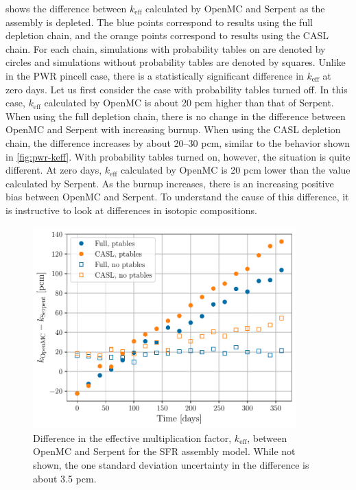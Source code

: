 \documentclass[3p,authoryear]{elsarticle}
\begin{document}
 shows the difference between $k_\text{eff}$ calculated by
OpenMC and Serpent as the assembly is depleted. The blue points correspond to
results using the full depletion chain, and the orange points correspond to
results using the CASL chain. For each chain, simulations with probability
tables on are denoted by circles and simulations without probability tables are
denoted by squares. Unlike in the PWR pincell case, there is a statistically
significant difference in $k_\text{eff}$ at zero days. Let us first consider the
case with probability tables turned off. In this case, $k_\text{eff}$ calculated
by OpenMC is about 20 pcm higher than that of Serpent. When using the full
depletion chain, there is no change in the difference between OpenMC and Serpent
with increasing burnup. When using the CASL depletion chain, the difference
increases by about 20--30 pcm, similar to the behavior shown in
\cref{fig:pwr-keff}. With probability tables turned on, however, the situation
is quite different. At zero days, $k_\text{eff}$ calculated by OpenMC is 20 pcm
lower than the value calculated by Serpent. As the burnup increases, there is an
increasing positive bias between OpenMC and Serpent. To understand the cause of
this difference, it is instructive to look at differences in isotopic
compositions.
\begin{figure}[H]
  \centering
  \includegraphics[width=4in]{figures/sfr_keff.pdf}
  \caption{Difference in the effective multiplication factor, $k_\text{eff}$,
  between OpenMC and Serpent for the SFR assembly model. While not shown, the one
  standard deviation uncertainty in the difference is about 3.5 pcm.}
  \label{fig:sfr-keff}
\end{figure}
\end{document}
